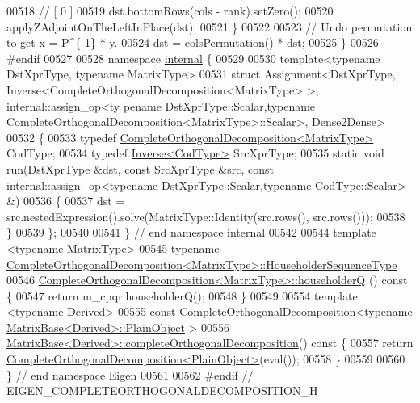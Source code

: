 \begin{DoxyCode}
00518     \textcolor{comment}{//                   [ 0 ]}
00519     dst.bottomRows(cols - rank).setZero();
00520     applyZAdjointOnTheLeftInPlace(dst);
00521   \}
00522 
00523   \textcolor{comment}{// Undo permutation to get x = P^\{-1\} * y.}
00524   dst = colsPermutation() * dst;
00525 \}
00526 \textcolor{preprocessor}{#endif}
00527 
00528 \textcolor{keyword}{namespace }\hyperlink{namespaceinternal}{internal} \{
00529 
00530 \textcolor{keyword}{template}<\textcolor{keyword}{typename} DstXprType, \textcolor{keyword}{typename} MatrixType>
00531 \textcolor{keyword}{struct }Assignment<DstXprType, Inverse<CompleteOrthogonalDecomposition<MatrixType> >, internal::assign\_op<ty
      pename DstXprType::Scalar,typename CompleteOrthogonalDecomposition<MatrixType>::Scalar>, Dense2Dense>
00532 \{
00533   \textcolor{keyword}{typedef} \hyperlink{group___q_r___module_class_eigen_1_1_complete_orthogonal_decomposition}{CompleteOrthogonalDecomposition<MatrixType>} CodType;
00534   \textcolor{keyword}{typedef} \hyperlink{class_eigen_1_1_inverse}{Inverse<CodType>} SrcXprType;
00535   \textcolor{keyword}{static} \textcolor{keywordtype}{void} run(DstXprType &dst, \textcolor{keyword}{const} SrcXprType &src, \textcolor{keyword}{const} 
      \hyperlink{struct_eigen_1_1internal_1_1assign__op}{internal::assign\_op<typename DstXprType::Scalar,typename CodType::Scalar>}
       &)
00536   \{
00537     dst = src.nestedExpression().solve(MatrixType::Identity(src.rows(), src.rows()));
00538   \}
00539 \};
00540 
00541 \} \textcolor{comment}{// end namespace internal}
00542 
00544 \textcolor{keyword}{template} <\textcolor{keyword}{typename} MatrixType>
00545 \textcolor{keyword}{typename} \hyperlink{group___householder___module_class_eigen_1_1_householder_sequence}{CompleteOrthogonalDecomposition<MatrixType>::HouseholderSequenceType}
00546 \hyperlink{group___q_r___module_ac95b93ddad59c6e57d06fcd4737b27e1}{CompleteOrthogonalDecomposition<MatrixType>::householderQ}
      ()\textcolor{keyword}{ const }\{
00547   \textcolor{keywordflow}{return} m\_cpqr.householderQ();
00548 \}
00549 
00554 \textcolor{keyword}{template} <\textcolor{keyword}{typename} Derived>
00555 \textcolor{keyword}{const} \hyperlink{group___q_r___module_class_eigen_1_1_complete_orthogonal_decomposition}{CompleteOrthogonalDecomposition<typename MatrixBase<Derived>::PlainObject}
      >
00556 \hyperlink{group___core___module_ae90b6846f05bd30b8d52b66e427e3e09}{MatrixBase<Derived>::completeOrthogonalDecomposition}()\textcolor{keyword}{
       const }\{
00557   \textcolor{keywordflow}{return} \hyperlink{group___q_r___module_class_eigen_1_1_complete_orthogonal_decomposition}{CompleteOrthogonalDecomposition<PlainObject>}(eval());
00558 \}
00559 
00560 \}  \textcolor{comment}{// end namespace Eigen}
00561 
00562 \textcolor{preprocessor}{#endif  // EIGEN\_COMPLETEORTHOGONALDECOMPOSITION\_H}
\end{DoxyCode}
